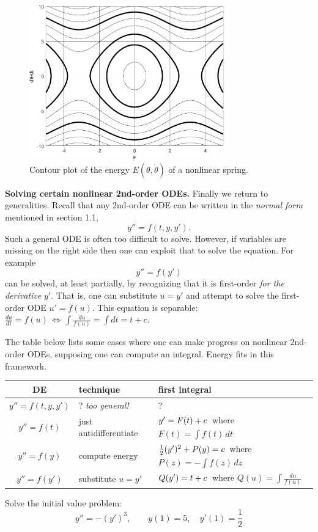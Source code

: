 \documentclass[12pt]{article}
\theoremstyle{definition}
\begin{document}
\begin{figure}[h]
\begin{center}
\includegraphics[width=0.75\textwidth]{pendulumcurves}
\end{center}

\vspace{-5mm}
\caption{Contour plot of the energy $E(\theta,\dot\theta)$ of a nonlinear spring.}
\end{figure}

\medskip
\textbf{Solving certain nonlinear 2nd-order ODEs.}  Finally we return to generalities.  Recall that any 2nd-order ODE can be written in the \emph{normal form} mentioned in section 1.1,
    $$y'' = f(t,y,y').$$
Such a general ODE is often too difficult to solve.  However, if variables are missing on the right side then one can exploit that to solve the equation.  For example
    $$y'' = f(y')$$
can be solved, at least partially, by recognizing that it is first-order \emph{for the derivative} $y'$.  That is, one can substitute $u=y'$ and attempt to solve the first-order ODE $u'=f(u)$.  This equation is separable: \, $\frac{du}{dt} = f(u) \, \iff \, \int \frac{du}{f(u)} = \int dt = t + c$.

The table below lists some cases where one can make progress on nonlinear 2nd-order ODEs, supposing one can compute an integral.  Energy fits in this framework.

\medskip
\begin{tabular}{c|l|l}
DE & technique & first integral \\ \hline \hline
$y'' = f(t,y,y')$ & ? \quad \emph{too general!} & ? \\ \hline
$y'' = f(t)$ & just antidifferentiate & $y' = F(t)+c \large\strut$\, where $F(t) = \int f(t)\,dt$ \\ \hline
$y'' = f(y)$ & compute energy & $\frac{1}{2} (y')^2 + P(y) = c \large\strut$\, where $P(z) = -\int f(z)\,dz$ \\ \hline
$y'' = f(y')$ & substitute $u=y'$ & $Q(y') = t + c \large\strut$\, where $Q(u)=\int \frac{du}{f(u)}$
\end{tabular}

\medskip
\begin{exerpart}
Solve the initial value problem:
    $$y'' = - (y')^3, \qquad y(1)=5, \quad y'(1)=\frac{1}{2}$$
\end{exerpart}
\end{document}
